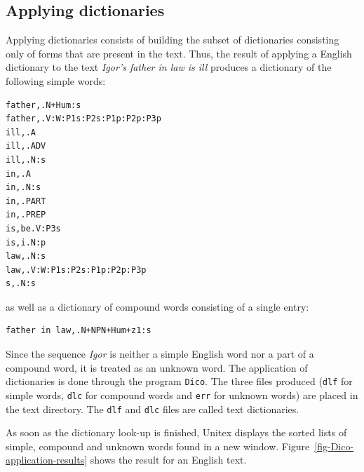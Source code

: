 \subsection{Applying dictionaries}
\label{text-applying-dictionaries}
Applying dictionaries consists of building the subset of dictionaries  consisting
only of forms that are present in the text. Thus, the result of applying a
English dictionary to the text \textit{Igor's father in law is ill} produces a
dictionary of the following simple words:

\bigskip
\begin{verbatim}
father,.N+Hum:s
father,.V:W:P1s:P2s:P1p:P2p:P3p
ill,.A
ill,.ADV
ill,.N:s
in,.A
in,.N:s
in,.PART
in,.PREP
is,be.V:P3s
is,i.N:p
law,.N:s
law,.V:W:P1s:P2s:P1p:P2p:P3p
s,.N:s
\end{verbatim}

\bigskip
\noindent as well as a dictionary of compound words consisting of a single
entry:

\bigskip
\begin{verbatim}
father in law,.N+NPN+Hum+z1:s
\end{verbatim}

\bigskip
\noindent Since the sequence \textit{Igor} is neither a simple English word nor a part of a
compound word, it is treated as an unknown word.  The
application of dictionaries is done through the program \verb+Dico+.
 The three files produced
(\verb+dlf+ for simple words, \verb+dlc+ for compound words and \verb+err+ for
unknown words) are placed in the text directory. The \verb+dlf+ and \verb+dlc+
files are called text dictionaries.  

\bigskip
\noindent As soon as the dictionary look-up  is finished, Unitex displays the sorted lists
of simple, compound and unknown words found in a new window.
Figure~\ref{fig-Dico-application-results} shows the result for an
English text.

